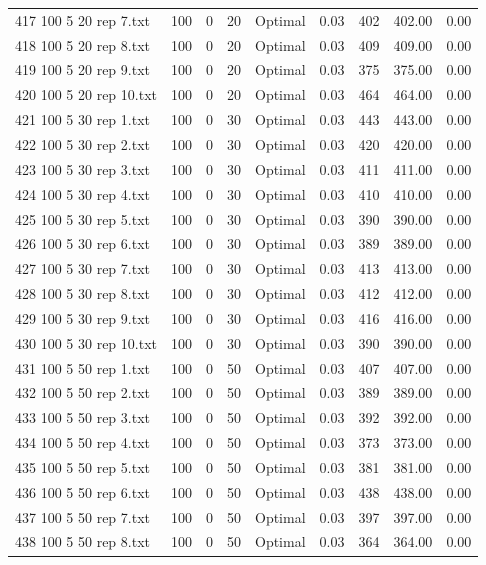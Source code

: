 \begin{longtable}{lrrllrrrr}
417 100 5 20 rep 7.txt & 100 & 0 & 20 & Optimal &  0.03 & 402 & 402.00 &  0.00\\
418 100 5 20 rep 8.txt & 100 & 0 & 20 & Optimal &  0.03 & 409 & 409.00 &  0.00\\
419 100 5 20 rep 9.txt & 100 & 0 & 20 & Optimal &  0.03 & 375 & 375.00 &  0.00\\
420 100 5 20 rep 10.txt & 100 & 0 & 20 & Optimal &  0.03 & 464 & 464.00 &  0.00\\
421 100 5 30 rep 1.txt & 100 & 0 & 30 & Optimal &  0.03 & 443 & 443.00 &  0.00\\
422 100 5 30 rep 2.txt & 100 & 0 & 30 & Optimal &  0.03 & 420 & 420.00 &  0.00\\
423 100 5 30 rep 3.txt & 100 & 0 & 30 & Optimal &  0.03 & 411 & 411.00 &  0.00\\
424 100 5 30 rep 4.txt & 100 & 0 & 30 & Optimal &  0.03 & 410 & 410.00 &  0.00\\
425 100 5 30 rep 5.txt & 100 & 0 & 30 & Optimal &  0.03 & 390 & 390.00 &  0.00\\
426 100 5 30 rep 6.txt & 100 & 0 & 30 & Optimal &  0.03 & 389 & 389.00 &  0.00\\
427 100 5 30 rep 7.txt & 100 & 0 & 30 & Optimal &  0.03 & 413 & 413.00 &  0.00\\
428 100 5 30 rep 8.txt & 100 & 0 & 30 & Optimal &  0.03 & 412 & 412.00 &  0.00\\
429 100 5 30 rep 9.txt & 100 & 0 & 30 & Optimal &  0.03 & 416 & 416.00 &  0.00\\
430 100 5 30 rep 10.txt & 100 & 0 & 30 & Optimal &  0.03 & 390 & 390.00 &  0.00\\
431 100 5 50 rep 1.txt & 100 & 0 & 50 & Optimal &  0.03 & 407 & 407.00 &  0.00\\
432 100 5 50 rep 2.txt & 100 & 0 & 50 & Optimal &  0.03 & 389 & 389.00 &  0.00\\
433 100 5 50 rep 3.txt & 100 & 0 & 50 & Optimal &  0.03 & 392 & 392.00 &  0.00\\
434 100 5 50 rep 4.txt & 100 & 0 & 50 & Optimal &  0.03 & 373 & 373.00 &  0.00\\
435 100 5 50 rep 5.txt & 100 & 0 & 50 & Optimal &  0.03 & 381 & 381.00 &  0.00\\
436 100 5 50 rep 6.txt & 100 & 0 & 50 & Optimal &  0.03 & 438 & 438.00 &  0.00\\
437 100 5 50 rep 7.txt & 100 & 0 & 50 & Optimal &  0.03 & 397 & 397.00 &  0.00\\
438 100 5 50 rep 8.txt & 100 & 0 & 50 & Optimal &  0.03 & 364 & 364.00 &  0.00\\

\end{longtable}
